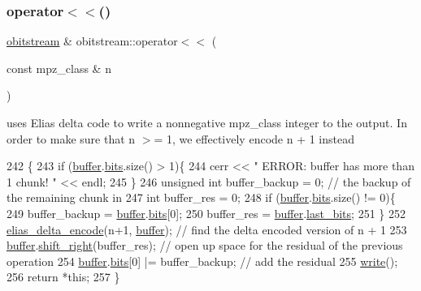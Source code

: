 \subsubsection{\texorpdfstring{operator$<$$<$()}{operator<<()}\hspace{0.1cm}{\footnotesize\ttfamily [2/2]}}
{\footnotesize\ttfamily \hyperlink{classobitstream}{obitstream} \& obitstream\+::operator$<$$<$ (\begin{DoxyParamCaption}\item[{const mpz\+\_\+class \&}]{n }\end{DoxyParamCaption})}



uses Elias delta code to write a nonnegative mpz\+\_\+class integer to the output. In order to make sure that n $>$= 1, we effectively encode n + 1 instead 


\begin{DoxyCode}
242                                                       \{
243   \textcolor{keywordflow}{if} (\hyperlink{classobitstream_aeaccad00a395a404aa16472bfa052be3}{buffer}.\hyperlink{classbit__pipe_a86f38af1e9736b053728033490476b50}{bits}.size() > 1)\{
244     cerr << \textcolor{stringliteral}{" ERROR: buffer has more than 1 chunk! "} << endl;
245   \}
246   \textcolor{keywordtype}{unsigned} \textcolor{keywordtype}{int} buffer\_backup = 0; \textcolor{comment}{// the backup of the remaining chunk in }
247   \textcolor{keywordtype}{int} buffer\_res = 0; 
248   \textcolor{keywordflow}{if} (\hyperlink{classobitstream_aeaccad00a395a404aa16472bfa052be3}{buffer}.\hyperlink{classbit__pipe_a86f38af1e9736b053728033490476b50}{bits}.size() != 0)\{
249     buffer\_backup = \hyperlink{classobitstream_aeaccad00a395a404aa16472bfa052be3}{buffer}.\hyperlink{classbit__pipe_a86f38af1e9736b053728033490476b50}{bits}[0];
250     buffer\_res = \hyperlink{classobitstream_aeaccad00a395a404aa16472bfa052be3}{buffer}.\hyperlink{classbit__pipe_a0f3e84b02751803adaab499b5dad86fe}{last\_bits};
251   \}
252   \hyperlink{bitstream_8cpp_a63daa014203b9a5b2622a264cbfdff7b}{elias\_delta\_encode}(n+1, \hyperlink{classobitstream_aeaccad00a395a404aa16472bfa052be3}{buffer}); \textcolor{comment}{// find the delta encoded version of n + 1 }
253   \hyperlink{classobitstream_aeaccad00a395a404aa16472bfa052be3}{buffer}.\hyperlink{classbit__pipe_a341a1f62d728a67f730503ca722a7770}{shift\_right}(buffer\_res); \textcolor{comment}{// open up space for the residual of the previous
       operation}
254   \hyperlink{classobitstream_aeaccad00a395a404aa16472bfa052be3}{buffer}.\hyperlink{classbit__pipe_a86f38af1e9736b053728033490476b50}{bits}[0] |= buffer\_backup; \textcolor{comment}{// add the residual}
255   \hyperlink{classobitstream_a5ac23633932baad040856f0a33ee1ebf}{write}();
256   \textcolor{keywordflow}{return} *\textcolor{keyword}{this};
257 \}
\end{DoxyCode}
\mbox{\label{classobitstream_a5ac23633932baad040856f0a33ee1ebf}} 
